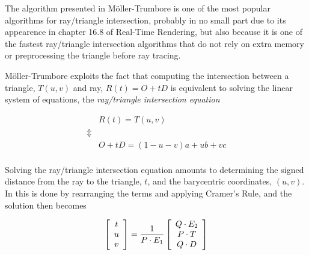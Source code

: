The algorithm presented in Möller-Trumbore is one of
the most popular algorithms for ray/triangle intersection, probably in no small
part due to its appearence in chapter 16.8 of Real-Time
Rendering, but also because it is one of the fastest ray/triangle
intersection algorithms that do not rely on extra memory or preprocessing the
triangle before ray tracing.


Möller-Trumbore exploits the fact that computing the
intersection between a triangle, $T(u, v)$ and ray, $R(t) = O + tD$ is
equivalent to solving the linear system of equations, the \textit{ray/triangle
  intersection equation}



\begin{displaymath}
  \begin{array}{rl}
    & R(t) = T(u,v) \\
    \Updownarrow \\
    & O + tD = (1-u-v)a + ub + vc \\
  \end{array}
\end{displaymath}


Solving the ray/triangle intersection equation amounts to determining the signed
distance from the ray to the triangle, $t$, and the barycentric coordinates,
$(u, v)$. In  this is done by rearranging the terms
and applying Cramer's Rule, and the solution then becomes

\begin{displaymath}
  \left[\begin{array}{c} t \\ u \\ v \end{array}\right] = \frac{1}{P \cdot E_1} 
  \left[\begin{array}{c} Q \cdot E_2 \\ P \cdot T \\ Q \cdot D \end{array}\right]
\end{displaymath}


